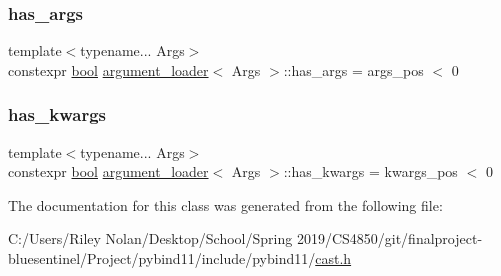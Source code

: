\subsubsection{\texorpdfstring{has\_args}{has\_args}}
{\footnotesize\ttfamily template$<$typename... Args$>$ \\
constexpr \mbox{\hyperlink{asdl_8h_af6a258d8f3ee5206d682d799316314b1}{bool}} \mbox{\hyperlink{classargument__loader}{argument\+\_\+loader}}$<$ Args $>$\+::has\+\_\+args = args\+\_\+pos $<$ 0\hspace{0.3cm}{\ttfamily [static]}}

\mbox{\label{classargument__loader_aefd489f954b4706554d6c4e7e705617f}} 
\subsubsection{\texorpdfstring{has\_kwargs}{has\_kwargs}}
{\footnotesize\ttfamily template$<$typename... Args$>$ \\
constexpr \mbox{\hyperlink{asdl_8h_af6a258d8f3ee5206d682d799316314b1}{bool}} \mbox{\hyperlink{classargument__loader}{argument\+\_\+loader}}$<$ Args $>$\+::has\+\_\+kwargs = kwargs\+\_\+pos $<$ 0\hspace{0.3cm}{\ttfamily [static]}}



The documentation for this class was generated from the following file\+:\begin{DoxyCompactItemize}
\item 
C\+:/\+Users/\+Riley Nolan/\+Desktop/\+School/\+Spring 2019/\+C\+S4850/git/finalproject-\/bluesentinel/\+Project/pybind11/include/pybind11/\mbox{\hyperlink{cast_8h}{cast.\+h}}\end{DoxyCompactItemize}
